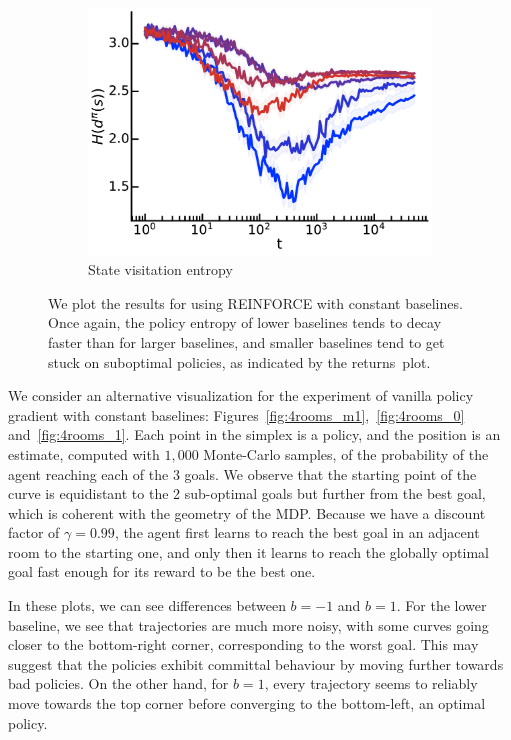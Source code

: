 \begin{figure}[!ht]
\begin{subfigure}[b]{0.32\linewidth}
    \includegraphics[width=\textwidth]{articles/baselines/figs/baseline_4rooms/entropy_ds}
    \caption{State visitation entropy}
  \end{subfigure}
  \caption{We plot the results for using REINFORCE with constant baselines. Once again, the policy entropy of lower baselines tends to decay faster than for larger baselines, and smaller baselines tend to get stuck on suboptimal policies, as indicated by the returns~plot.~\label{appfig:4rooms_vpg_constant_baselines}}
\end{figure}

We consider an alternative visualization for the experiment of vanilla policy gradient with constant baselines: Figures~\ref{fig:4rooms_m1},~\ref{fig:4rooms_0} and~\ref{fig:4rooms_1}. Each point in the simplex is a policy, and the position is an estimate, computed with $1,000$ Monte-Carlo samples, of the probability of the agent reaching each of the 3 goals. We observe that the starting point of the curve is equidistant to the 2 sub-optimal goals but further from the best goal, which is coherent with the geometry of the MDP. Because we have a discount factor of $\gamma = 0.99$, the agent first learns to reach the best goal in an adjacent room to the starting one, and only then it learns to reach the globally optimal goal fast enough for its reward to be the best one. 

In these plots, we can see differences between $b=-1$ and $b=1$. For the lower baseline, we see that trajectories are much more noisy, with some curves going closer to the bottom-right corner, corresponding to the worst goal. This may suggest that the policies exhibit committal behaviour by moving further towards bad policies. On the other hand, for $b=1$, every trajectory seems to reliably move towards the top corner before converging to the bottom-left, an optimal policy.


